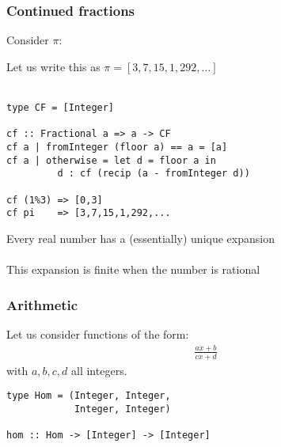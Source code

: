 \documentclass[11pt]{beamer}
\begin{document}
\begin{frame}
\frametitle{Continued fractions}
Consider $\pi$:
\end{frame}

\begin{frame}[fragile]
Let us write this as $\pi = [3,7,15,1,292,\dots]$
\\~\\
\begin{verbatim}
type CF = [Integer]

cf :: Fractional a => a -> CF
cf a | fromInteger (floor a) == a = [a]
cf a | otherwise = let d = floor a in
         d : cf (recip (a - fromInteger d))

cf (1%3) => [0,3]
cf pi    => [3,7,15,1,292,...
\end{verbatim}
Every real number has a (essentially) unique expansion
\\~\\
This expansion is finite when the number is rational
\end{frame}

\begin{frame}[fragile]
\frametitle{Arithmetic}
Let us consider functions of the form:
\begin{align*}
\frac{ax + b}{cx + d}
\end{align*}
with $a,b,c,d$ all integers.
\begin{verbatim}
type Hom = (Integer, Integer,
            Integer, Integer)

hom :: Hom -> [Integer] -> [Integer]
\end{verbatim}
\end{frame}
\end{document}
